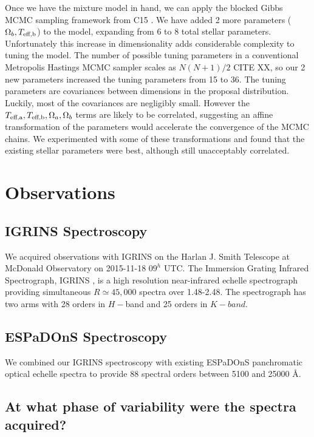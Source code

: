 \documentclass[onecolumn]{emulateapj}%
\newcommand{\iancze}{{\sc C15 }}
\begin{document}
Once we have the mixture model in hand, we can apply the blocked Gibbs MCMC sampling framework from \iancze.  We have added 2 more parameters ($\Omega_b, T_\textrm{eff,b}$) to the model, expanding from 6 to 8 total stellar parameters.  Unfortunately this increase in dimensionality adds considerable complexity to tuning the model.  The number of possible tuning parameters in a conventional Metropolis Hastings MCMC sampler scales as $N(N+1)/2$ CITE XX, so our 2 new parameters increased the tuning parameters from 15 to 36.  The tuning parameters are covariances between dimensions in the proposal distribution.  Luckily, most of the covariances are negligibly small.  However the $T_\textrm{eff,a}, T_\textrm{eff,b}, \Omega_a, \Omega_b$ terms are likely to be correlated, suggesting an affine transformation of the parameters would accelerate the convergence of the MCMC chains.  We experimented with some of these transformations and found that the existing stellar parameters were best, although still unacceptably correlated.


\section{Observations}\label{sec:obs} 

\subsection{IGRINS Spectroscopy}\label{sec:igrins} 
We acquired observations with IGRINS on the Harlan J. Smith Telescope at McDonald Observatory on 2015-11-18 $09^h$ UTC.  The Immersion Grating Infrared Spectrograph, IGRINS \citep{2014SPIE.9147E..1DP,2012SPIE.8450E..2SG}, is a high resolution near-infrared echelle spectrograph providing simultaneous $R\simeq45,000$ spectra over 1.48-2.48\um.  The spectrograph has two arms with 28 orders in $H-$band and 25 orders in $K-band$.

\subsection{ESPaDOnS Spectroscopy}
We combined our IGRINS spectroscopy with existing ESPaDOnS panchromatic optical echelle spectra to provide 88 spectral orders between 5100 and 25000 \AA \citep{2014MNRAS.444.3220D}.

\subsection{At what phase of variability were the spectra acquired?}
\end{document}

